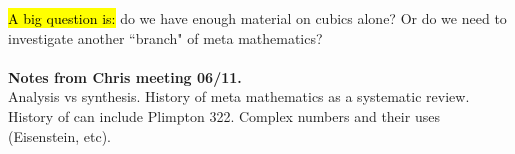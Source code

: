 \documentclass[12pt]{article}
\begin{document}
\noindent \hl{A big question is:} do we have enough material on cubics alone? Or do we need to investigate another ``branch" of meta mathematics?\\\\
\textbf{Notes from Chris meeting 06/11.}\\
Analysis vs synthesis. History of meta mathematics as a systematic review. History of can include Plimpton 322. Complex numbers and their uses (Eisenstein, etc). 



\pagebreak 


\nocite{*}
\printbibliography{}
\end{document}
